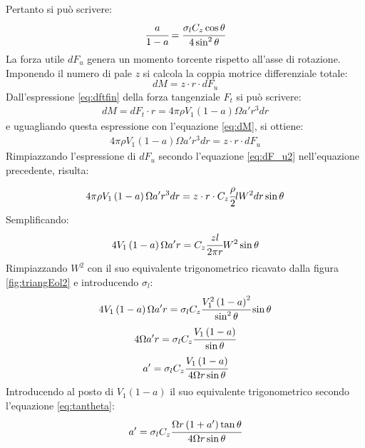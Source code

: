 Pertanto si può scrivere:
\begin{equation}\label{eq:asolid}
\cfrac{a}{1-a} = \cfrac{\sigma_l C_z \cos \theta}{4 \sin^2 \theta}
\end{equation}
La forza utile $dF_u$ genera un momento torcente rispetto all'asse di rotazione. Imponendo il numero di pale $z$ si calcola la coppia motrice differenziale totale:
\begin{equation}\label{eq:dM}
dM = z \cdot r \cdot dF_u
\end{equation}
Dall'espressione \ref{eq:dftfin} della forza tangenziale $F_t$ si può scrivere:
\begin{align*}
dM = dF_t \cdot r = 4 \pi \rho V_1 \left( 1- a \right) \Omega a' r^3 dr
\end{align*}
e uguagliando questa espressione con l'equazione \ref{eq:dM}, si ottiene:
\begin{align*}
4 \pi \rho V_1 \left(1-a \right) \Omega a' r^3 dr = z \cdot r \cdot dF_u
\end{align*}
Rimpiazzando l'espressione di $dF_u$ secondo l'equazione \ref{eq:dF_u2} nell'equazione precedente, risulta:
\begin{align*}
4 \pi \rho V_1 \left(1-a \right) \Omega a' r^3 dr = z \cdot r \cdot C_z \cfrac{\rho}{2} l W^2 dr \sin \theta
\end{align*}
Semplificando:
\begin{align*}
4 V_1 \left(1-a \right) \Omega a' r = C_z \cfrac{z l }{2 \pi r} W^2 \sin \theta
\end{align*}
Rimpiazzando $W^2$ con il suo equivalente trigonometrico ricavato dalla figura \ref{fig:triangEol2} e introducendo $\sigma_l$:
\begin{align*}
4 V_1 \left(1-a \right) \Omega a' r = \sigma_l C_z \cfrac{V_1^2 \left(1-a \right)^2}{\sin^2 \theta} \sin \theta
\end{align*}
\begin{align*}
4 \Omega a' r = \sigma_l C_z \cfrac{V_1 \left(1-a \right)}{\sin \theta}
\end{align*}
\begin{align*}
a'= \sigma_l C_z \cfrac{V_1 \left(1-a \right)}{4 \Omega r \sin \theta}
\end{align*}
Introducendo al posto di $V_1 \left(1-a\right)$ il suo equivalente trigonometrico secondo l'equazione \ref{eq:tantheta}:
\begin{align*}
a' = \sigma_l C_z \cfrac{\Omega r \left(1+a' \right) \tan \theta}{4 \Omega r \sin \theta}
\end{align*}

